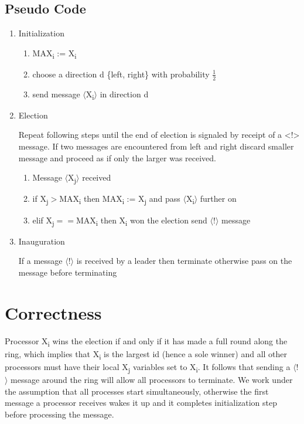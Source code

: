 \documentclass[a4paper,12pt]{article}
\begin{document}
\subsection*{Pseudo Code}
\begin{enumerate}
    \item Initialization
    \begin{enumerate}
        \item[] MAX\textsubscript{i} := X\textsubscript{i}
        \item[] choose a direction d \{left, right\} with probability $\frac{1}{2}$
        \item[] send message $\langle$X\textsubscript{i}$\rangle$ in direction d
    \end{enumerate}
    \item Election
    
    Repeat following steps until the end of election is signaled by receipt of a <!> message.
    If two messages are encountered from left and right discard smaller message and proceed as if only the larger was received.
    \begin{enumerate}
        \item[] Message $\langle$X\textsubscript{j}$\rangle$ received
        \item[] if X\textsubscript{j}$>$MAX\textsubscript{i} then MAX\textsubscript{i} := X\textsubscript{j} and pass $\langle$X\textsubscript{i}$\rangle$ further on
        \item[] elif X\textsubscript{j}$==$MAX\textsubscript{i} then X\textsubscript{i} won the election send $\langle$!$\rangle$ message
    \end{enumerate}
    \item Inauguration

    If a message $\langle$!$\rangle$ is received by a leader then terminate otherwise pass on the message before terminating
\end{enumerate}


\section{Correctness}
Processor X\textsubscript{i} wins the election if and only if it has made a full round along the ring, which implies that X\textsubscript{i} is the largest id (hence a sole winner) and all other processors must have their local X\textsubscript{j} variables set to X\textsubscript{i}. It follows that sending a $\langle$!$\rangle$ message around the ring will allow all processors to terminate. We work under the assumption that all processes start simultaneously, otherwise the first message a processor receives wakes it up and it completes initialization step before processing the message.
\end{document}

